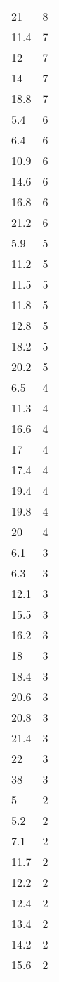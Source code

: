 \begin{table}[ht]
\begin{tabular}{lr}
  21 &   8 \\ 
  11.4 &   7 \\ 
  12 &   7 \\ 
  14 &   7 \\ 
  18.8 &   7 \\ 
  5.4 &   6 \\ 
  6.4 &   6 \\ 
  10.9 &   6 \\ 
  14.6 &   6 \\ 
  16.8 &   6 \\ 
  21.2 &   6 \\ 
  5.9 &   5 \\ 
  11.2 &   5 \\ 
  11.5 &   5 \\ 
  11.8 &   5 \\ 
  12.8 &   5 \\ 
  18.2 &   5 \\ 
  20.2 &   5 \\ 
  6.5 &   4 \\ 
  11.3 &   4 \\ 
  16.6 &   4 \\ 
  17 &   4 \\ 
  17.4 &   4 \\ 
  19.4 &   4 \\ 
  19.8 &   4 \\ 
  20 &   4 \\ 
  6.1 &   3 \\ 
  6.3 &   3 \\ 
  12.1 &   3 \\ 
  15.5 &   3 \\ 
  16.2 &   3 \\ 
  18 &   3 \\ 
  18.4 &   3 \\ 
  20.6 &   3 \\ 
  20.8 &   3 \\ 
  21.4 &   3 \\ 
  22 &   3 \\ 
  38 &   3 \\ 
  5 &   2 \\ 
  5.2 &   2 \\ 
  7.1 &   2 \\ 
  11.7 &   2 \\ 
  12.2 &   2 \\ 
  12.4 &   2 \\ 
  13.4 &   2 \\ 
  14.2 &   2 \\ 
  15.6 &   2 \\ 

\end{tabular}
\end{table}

